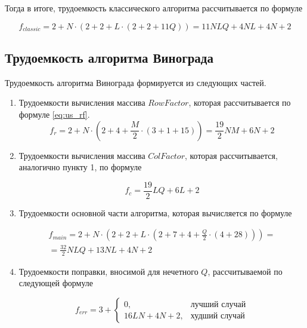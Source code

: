 \clearpage
Тогда в итоге, трудоемкость классического алгоритма рассчитывается по формуле

\begin{equation}
	\label{eq:classic_compl}
	f_{classic} = 2 + N \cdot (2 + 2 + L \cdot (2 + 2 + 11Q)) = 11NLQ + 4NL + 4N + 2
\end{equation}

\subsection{Трудоемкость алгоритма Винограда}

Трудоемкость алгоритма Винограда формируется из следующих частей.
\begin{enumerate}
	\item Трудоемкости вычисления массива $RowFactor$, которая рассчитывается по формуле \eqref{eq:us_rf}.
	\begin{equation}
		\label{eq:us_rf}
		f_{r} = 2 + N \cdot (2 + 4 + \frac{M}{2} \cdot (3 + 1 + 15)) = \frac{19}{2}NM + 6N + 2
	\end{equation}
	\item Трудоемкости вычисления массива $ColFactor$, которая рассчитывается, аналогично пункту 1, по формуле
	
	\begin{equation}
		\label{eq:us_rс}
		f_{c} = \frac{19}{2}LQ + 6L + 2
	\end{equation}
	
	\item Трудоемкости основной части алгоритма, которая вычисляется по формуле
	
	\begin{equation}
		\label{eq:us_vin_main}
		\begin{gathered}
		f_{main} = 2 + N \cdot (2 + 2 + L \cdot (2 + 7 + 4 + \frac{Q}{2} \cdot (4 + 28))) = \\
		= \frac{32}{2} NLQ + 13NL + 4N + 2
		\end{gathered}
	\end{equation}
	
	\item Трудоемкости поправки, вносимой для нечетного $Q$, рассчитываемой по следующей формуле
	
	\begin{equation}
		\label{eq:vin_error}
		f_{err} = 3 +
		\begin{cases}
			0, & \text{лучший случай}\\
			16LN + 4N + 2, & \text{худший случай}
		\end{cases}
	\end{equation}
	
\end{enumerate}

